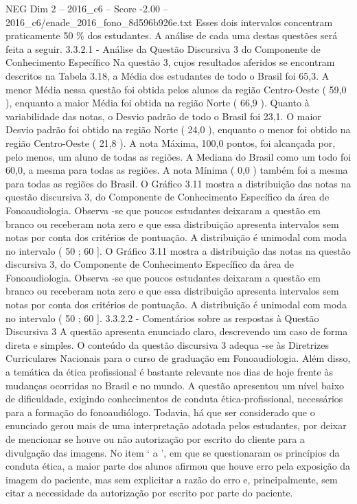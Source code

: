 \begin{textsample}{NEG Dim 2 – 2016\_c6 – Score -2.00 – 2016\_c6/enade\_2016\_fono\_8d596b926e.txt}
Esses dois intervalos concentram praticamente 50 \% dos estudantes.
A análise de cada uma destas questões será feita a seguir. 3.3.2.1 - Análise da Questão Discursiva 3 do Componente de Conhecimento Específico Na questão 3, cujos resultados aferidos se encontram descritos na Tabela 3.18, a Média dos estudantes de todo o Brasil foi 65,3.
A menor Média nessa questão foi obtida pelos alunos da região Centro-Oeste ( 59,0 ), enquanto a maior Média foi obtida na região Norte ( 66,9 ).
Quanto à variabilidade das notas, o Desvio padrão de todo o Brasil foi 23,1.
O maior Desvio padrão foi obtido na região Norte ( 24,0 ), enquanto o menor foi obtido na região Centro-Oeste ( 21,8 ).
A nota Máxima, 100,0 pontos, foi alcançada por, pelo menos, um aluno de todas as regiões.
A Mediana do Brasil como um todo foi 60,0, a mesma para todas as regiões.
A nota Mínima ( 0,0 ) também foi a mesma para todas as regiões do Brasil.
O Gráfico 3.11 mostra a distribuição das notas na questão discursiva 3, do Componente de Conhecimento Específico da área de Fonoaudiologia.
Observa -se que poucos estudantes deixaram a questão em branco ou receberam nota zero e que essa distribuição apresenta intervalos sem notas por conta dos critérios de pontuação.
A distribuição é unimodal com moda no intervalo ( 50 ; 60 ].
O Gráfico 3.11 mostra a distribuição das notas na questão discursiva 3, do Componente de Conhecimento Específico da área de Fonoaudiologia.
Observa -se que poucos estudantes deixaram a questão em branco ou receberam nota zero e que essa distribuição apresenta intervalos sem notas por conta dos critérios de pontuação.
A distribuição é unimodal com moda no intervalo ( 50 ; 60 ]. 3.3.2.2 - Comentários sobre as respostas à Questão Discursiva 3 A questão apresenta enunciado claro, descrevendo um caso de forma direta e simples.
O conteúdo da questão discursiva 3 adequa -se às Diretrizes Curriculares Nacionais para o curso de graduação em Fonoaudiologia.
Além disso, a temática da ética profissional é bastante relevante nos dias de hoje frente às mudanças ocorridas no Brasil e no mundo.
A questão apresentou um nível baixo de dificuldade, exigindo conhecimentos de conduta ética-profissional, necessários para a formação do fonoaudiólogo.
Todavia, há que ser considerado que o enunciado gerou mais de uma interpretação adotada pelos estudantes, por deixar de mencionar se houve ou não autorização por escrito do cliente para a divulgação das imagens.
No item ‘ a ’, em que se questionaram os princípios da conduta ética, a maior parte dos alunos afirmou que houve erro pela exposição da imagem do paciente, mas sem explicitar a razão do erro e, principalmente, sem citar a necessidade da autorização por escrito por parte do paciente.

\end{textsample}
